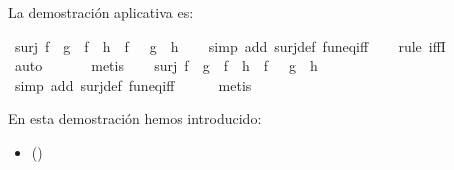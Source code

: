 \begin{isabellebody}
\begin{isamarkuptext}
La demostración aplicativa es:%
\end{isamarkuptext}\isamarkuptrue%
\isamarkupfalse%
\ {\isachardoublequoteopen}surj\ f\ {\isasymLongrightarrow}\ {\isacharparenleft}{\isacharparenleft}g\ {\isasymcirc}\ f{\isacharparenright}\ {\isacharequal}\ {\isacharparenleft}h\ {\isasymcirc}\ f{\isacharparenright}\ {\isacharparenright}\ {\isacharequal}\ {\isacharparenleft}g\ {\isacharequal}\ h{\isacharparenright}{\isachardoublequoteclose}\isanewline
%
\isadelimproof
\ \ %
\endisadelimproof
%
\isatagproof
{}\isamarkupfalse%
\ {\isacharparenleft}simp\ add{\isacharcolon}\ surj{\isacharunderscore}def\ fun{\isacharunderscore}eq{\isacharunderscore}iff{\isacharparenright}\isanewline
\ \ \isamarkupfalse%
\ {\isacharparenleft}rule\ iffI{\isacharparenright}\isanewline
\ \ \ \isamarkupfalse%
\ {}\isanewline
\ \ \isamarkupfalse%
\ auto\isanewline
\ \isanewline
\ \ \isamarkupfalse%
\ \ metis\isanewline
\isanewline
\ \ \isamarkupfalse%
%
\endisatagproof
{\isafoldproof}%
%
\isadelimproof
\isanewline
%
\endisadelimproof
\isanewline
{}\isamarkupfalse%
\ {\isachardoublequoteopen}surj\ f\ {\isasymLongrightarrow}\ {\isacharparenleft}{\isacharparenleft}g\ {\isasymcirc}\ f{\isacharparenright}\ {\isacharequal}\ {\isacharparenleft}h\ {\isasymcirc}\ f{\isacharparenright}\ {\isacharparenright}\ {\isacharequal}\ {\isacharparenleft}g\ {\isacharequal}\ h{\isacharparenright}{\isachardoublequoteclose}\isanewline
%
\isadelimproof
\ \ %
\endisadelimproof
%
\isatagproof
{}\isamarkupfalse%
\ {\isacharparenleft}simp\ add{\isacharcolon}\ surj{\isacharunderscore}def\ fun{\isacharunderscore}eq{\isacharunderscore}iff\ {\isacharparenright}\ \isanewline
\ \ \isamarkupfalse%
\ metis%
\endisatagproof
{\isafoldproof}%
%
\isadelimproof
%
\endisadelimproof
%
\begin{isamarkuptext}%
En esta demostración hemos introducido:
 \begin{itemize}
    \item[]  
      \hfill ()
  \end{itemize}%
\end{isamarkuptext}\isamarkuptrue%
%
\isadelimtheory
%
\endisadelimtheory
%
\isatagtheory
%
\endisatagtheory
{\isafoldtheory}%
%
\isadelimtheory
%
\endisadelimtheory
%
\end{isabellebody}%
